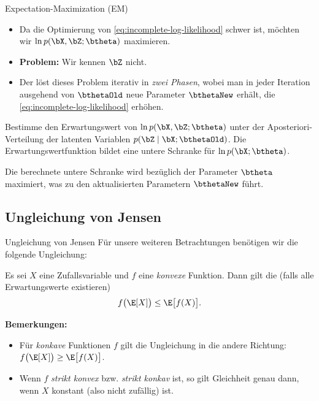 \begin{frame}{Expectation-Maximization (EM)}{}
	\begin{itemize}
		\item Da die Optimierung von \eqref{eq:incomplete-log-likelihood} schwer ist, möchten wir $\ln p(\bX, \bZ; \btheta)$ maximieren.
		\item \textbf{Problem:} Wir kennen $\bZ$ nicht.
		\item Der  löst dieses Problem iterativ in \textit{zwei Phasen},
			wobei man in jeder Iteration ausgehend von $\bthetaOld$ neue Parameter $\bthetaNew$ erhält,
			die \eqref{eq:incomplete-log-likelihood} erhöhen.
	\end{itemize}

	\begin{boxGray}
		 Bestimme den Erwartungswert von $\ln p(\bX, \bZ; \btheta)$ unter der Aposteriori-Verteilung der latenten Variablen
		$p(\bZ \mid \bX; \bthetaOld)$. Die Erwartungswertfunktion bildet eine untere Schranke für $\ln p(\bX; \btheta)$.
	\end{boxGray}

	\begin{boxGray}
		 Die berechnete untere Schranke wird bezüglich der Parameter $\btheta$ maximiert,
		was zu den aktualisierten Parametern $\bthetaNew$ führt.
	\end{boxGray}
\end{frame}


\subsection{Ungleichung von Jensen}

\begin{frame}{Ungleichung von Jensen}{}
	Für unsere weiteren Betrachtungen benötigen wir die folgende Ungleichung:
	\begin{mytheo}[th:jensen]
		Es sei $X$ eine Zufallsvariable und $f$ eine \textit{konvexe} Funktion. Dann gilt die 
		(falls alle Erwartungswerte existieren)
		\begin{equation*}
			f\bigl( \E[X] \bigr) \le \E\bigl[ f(X) \bigr].
		\end{equation*}
	\end{mytheo}
	
	\textbf{Bemerkungen:}
	\begin{itemize}
		\item Für \textit{konkave} Funktionen $f$ gilt die Ungleichung in die andere Richtung: $f\bigl( \E[X] \bigr) \ge \E\bigl[ f(X) \bigr]$.
		\item Wenn $f$  \textit{strikt konvex} bzw. \textit{strikt konkav} ist, so gilt Gleichheit genau dann, wenn $X$ konstant (also nicht zufällig) ist.
	\end{itemize}
\end{frame}


